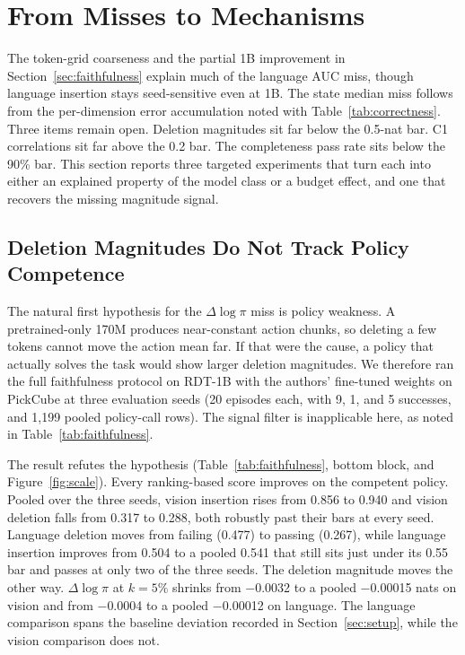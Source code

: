 \documentclass{article}
\begin{document}
\section{From Misses to Mechanisms}
\label{sec:mechanisms}

The token-grid coarseness and the partial 1B improvement in Section~\ref{sec:faithfulness} explain much of the language AUC miss, though language insertion stays seed-sensitive even at 1B.
The state median miss follows from the per-dimension error accumulation noted with Table~\ref{tab:correctness}.
Three items remain open.
Deletion magnitudes sit far below the 0.5-nat bar.
C1 correlations sit far above the 0.2 bar.
The completeness pass rate sits below the 90\% bar.
This section reports three targeted experiments that turn each into either an explained property of the model class or a budget effect, and one that recovers the missing magnitude signal.

\subsection{Deletion Magnitudes Do Not Track Policy Competence}
\label{sec:contraction}

The natural first hypothesis for the $\Delta\log\pi$ miss is policy weakness.
A pretrained-only 170M produces near-constant action chunks, so deleting a few tokens cannot move the action mean far.
If that were the cause, a policy that actually solves the task would show larger deletion magnitudes.
We therefore ran the full faithfulness protocol on RDT-1B with the authors' fine-tuned weights on PickCube at three evaluation seeds (20 episodes each, with 9, 1, and 5 successes, and 1{,}199 pooled policy-call rows).
The signal filter is inapplicable here, as noted in Table~\ref{tab:faithfulness}.

The result refutes the hypothesis (Table~\ref{tab:faithfulness}, bottom block, and Figure~\ref{fig:scale}).
Every ranking-based score improves on the competent policy.
Pooled over the three seeds, vision insertion rises from 0.856 to 0.940 and vision deletion falls from 0.317 to 0.288, both robustly past their bars at every seed. Language deletion moves from failing (0.477) to passing (0.267), while language insertion improves from 0.504 to a pooled 0.541 that still sits just under its 0.55 bar and passes at only two of the three seeds.
The deletion magnitude moves the other way.
$\Delta\log\pi$ at $k{=}5\%$ shrinks from $-$0.0032 to a pooled $-$0.00015 nats on vision and from $-$0.0004 to a pooled $-$0.00012 on language.
The language comparison spans the baseline deviation recorded in Section~\ref{sec:setup}, while the vision comparison does not.
\end{document}
